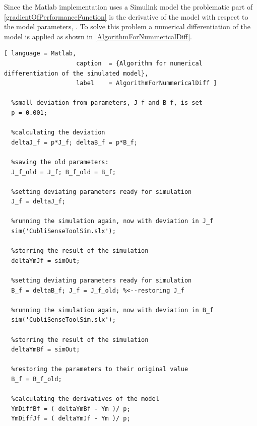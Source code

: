 Since the Matlab implementation uses a Simulink model the problematic part of \eqref{gradientOfPerformanceFunction} is the derivative of the model with respect to the model parameters, \si{}. To solve this problem a numerical differentiation of the model is applied as shown in \autoref{AlgorithmForNummericalDiff}.

\begin{lstlisting}[ language = Matlab,
                    caption  = {Algorithm for numerical differentiation of the simulated model},
                    label    = AlgorithmForNummericalDiff ]

  %small deviation from parameters, J_f and B_f, is set
  p = 0.001;
  
  %calculating the deviation
  deltaJ_f = p*J_f; deltaB_f = p*B_f;
  
  %saving the old parameters:
  J_f_old = J_f; B_f_old = B_f;
  
  %setting deviating parameters ready for simulation
  J_f = deltaJ_f;
  
  %running the simulation again, now with deviation in J_f
  sim('CubliSenseToolSim.slx');
  
  %storring the result of the simulation
  deltaYmJf = simOut;
  
  %setting deviating parameters ready for simulation
  B_f = deltaB_f; J_f = J_f_old; %<--restoring J_f
  
  %running the simulation again, now with deviation in B_f
  sim('CubliSenseToolSim.slx');
  
  %storring the result of the simulation
  deltaYmBf = simOut;
  
  %restoring the parameters to their original value
  B_f = B_f_old;
  
  %calculating the derivatives of the model
  YmDiffBf = ( deltaYmBf - Ym )/ p;
  YmDiffJf = ( deltaYmJf - Ym )/ p;
\end{lstlisting}


